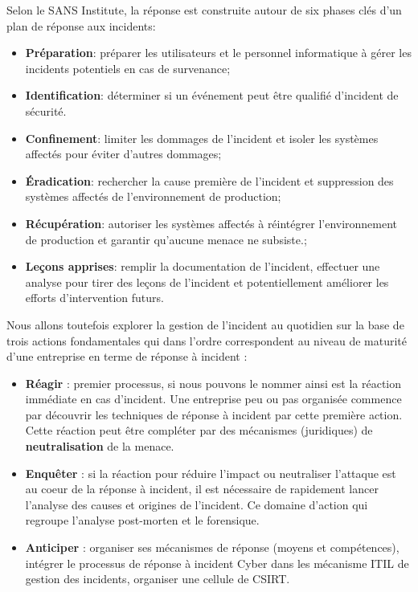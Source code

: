 Selon le SANS Institute, la réponse est construite autour de six phases clés d'un plan de réponse aux incidents:

\begin{itemize}
  \item \textbf{Préparation}: préparer les utilisateurs et le personnel informatique à gérer les incidents potentiels en cas de survenance;
  \item \textbf{Identification}: déterminer si un événement peut être qualifié d'incident de sécurité.
  \item \textbf{Confinement}: limiter les dommages de l'incident et isoler les systèmes affectés pour éviter d'autres dommages;
  \item \textbf{Éradication}: rechercher la cause première de l'incident et suppression des systèmes affectés de l'environnement de production;
  \item \textbf{Récupération}: autoriser les systèmes affectés à réintégrer l'environnement de production et garantir qu'aucune menace ne subsiste.;
  \item \textbf{Leçons apprises}: remplir la documentation de l'incident, effectuer une analyse pour tirer des leçons de l'incident et potentiellement améliorer les efforts d'intervention futurs.
\end{itemize}


Nous allons toutefois explorer la  gestion de l'incident au quotidien sur la base de trois actions fondamentales qui dans l'ordre correspondent au niveau de maturité d'une entreprise en terme de réponse à incident :


\begin{itemize}
  \item \textbf{Réagir} : premier processus, si nous pouvons le nommer ainsi est  la réaction immédiate en cas d'incident. Une entreprise peu ou pas organisée commence par découvrir les techniques de réponse à incident par cette première action. Cette réaction peut être compléter par des mécanismes (juridiques) de \textbf{neutralisation} de la menace.

  \item \textbf{Enquêter} : si la réaction pour réduire l'impact ou neutraliser l'attaque est au coeur de la réponse à incident, il est nécessaire de rapidement lancer l'analyse des causes et origines de l'incident. Ce domaine d'action qui regroupe l'analyse post-morten et le forensique.

  \item \textbf{Anticiper} : organiser ses mécanismes de réponse (moyens et compétences), intégrer le processus de réponse à incident Cyber dans les mécanisme ITIL de gestion des incidents, organiser une cellule de CSIRT.

\end{itemize}



